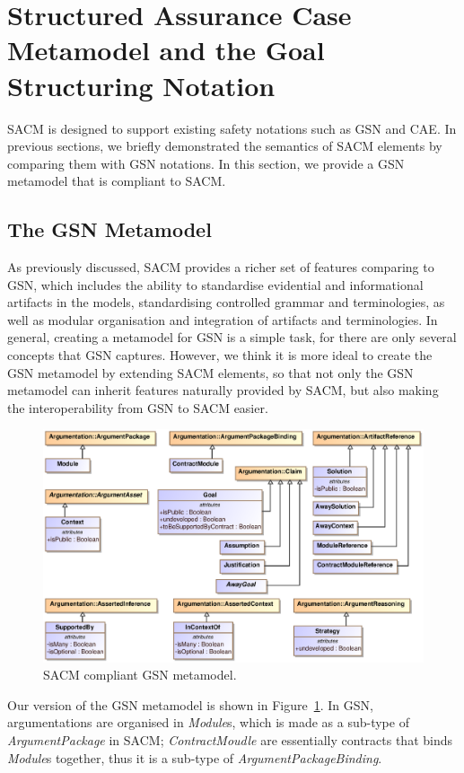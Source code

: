 \section{Structured Assurance Case Metamodel and the Goal Structuring Notation}
SACM is designed to support existing safety notations such as GSN and CAE. In previous sections, we briefly demonstrated the semantics of SACM elements by comparing them with GSN notations. In this section, we provide a GSN metamodel that is compliant to SACM. 

\subsection{The GSN Metamodel}
As previously discussed, SACM provides a richer set of features comparing to GSN, which includes the ability to standardise evidential and informational artifacts in the models, standardising controlled grammar and terminologies, as well as modular organisation and integration of artifacts and terminologies. In general, creating a metamodel for GSN is a simple task, for there are only several concepts that GSN captures. However, we think it is more ideal to create the GSN metamodel by extending SACM elements, so that not only the GSN metamodel can inherit features naturally provided by SACM, but also making the interoperability from GSN to SACM easier. 
\begin{figure}
	\centering
	\includegraphics[width=1\linewidth]{GSN.eps}
	\caption{SACM compliant GSN metamodel.}
	\label{fig:gsnMetamodel}
\end{figure}

Our version of the GSN metamodel is shown in Figure~\ref{fig:gsnMetamodel}. In GSN, argumentations are organised in \textit{Module}s, which is made as a sub-type of \textit{ArgumentPackage} in SACM; \textit{ContractMoudle} are essentially contracts that binds \textit{Module}s together, thus it is a sub-type of \textit{ArgumentPackageBinding}. 

